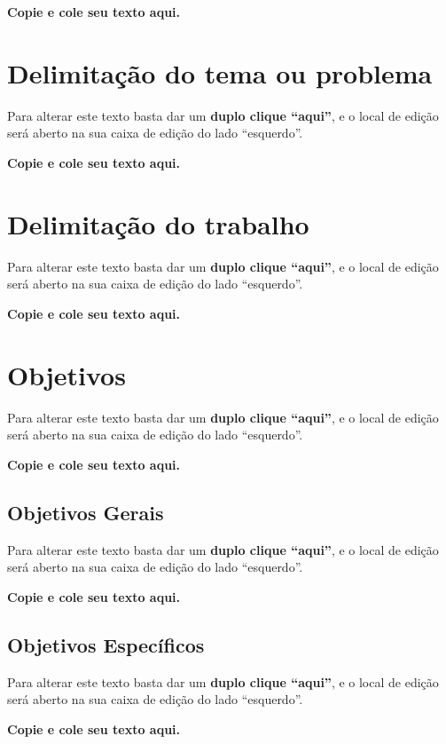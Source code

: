 \textbf{Copie e cole seu texto aqui.}


\section{Delimitação do tema ou problema}
Para alterar este texto basta dar um 
\textbf{duplo clique “aqui”}, e o local de edição será aberto na sua caixa de edição do lado “esquerdo”.

\textbf{Copie e cole seu texto aqui.}


\section{Delimitação do trabalho}

Para alterar este texto basta dar um 
\textbf{duplo clique “aqui”}, e o local de edição será aberto na sua caixa de edição do lado “esquerdo”.

\textbf{Copie e cole seu texto aqui.}

\section{Objetivos}

Para alterar este texto basta dar um 
\textbf{duplo clique “aqui”}, e o local de edição será aberto na sua caixa de edição do lado “esquerdo”.

\textbf{Copie e cole seu texto aqui.}

\subsection{Objetivos Gerais}
	
Para alterar este texto basta dar um 
\textbf{duplo clique “aqui”}, e o local de edição será aberto na sua caixa de edição do lado “esquerdo”.

\textbf{Copie e cole seu texto aqui.}

    
\subsection{Objetivos Específicos}
Para alterar este texto basta dar um 
\textbf{duplo clique “aqui”}, e o local de edição será aberto na sua caixa de edição do lado “esquerdo”.

\textbf{Copie e cole seu texto aqui.}
